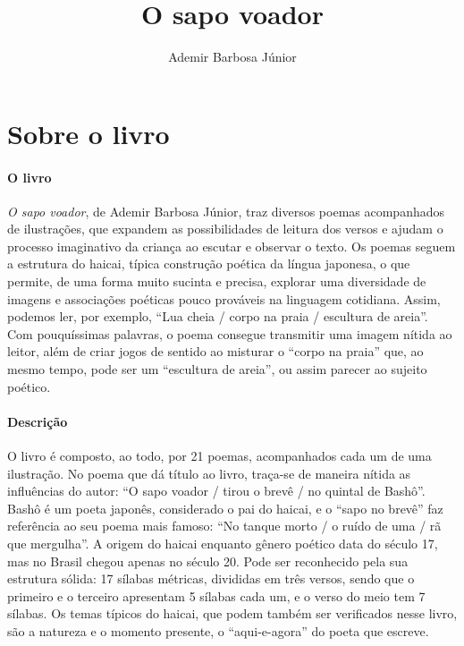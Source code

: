 \documentclass[11pt]{extarticle}
\newcommand{\AutorLivro}{Ademir Barbosa Júnior}
\newcommand{\TituloLivro}{O sapo voador}
\newcommand{\colaborador}{{Paulo Pompermaier e Renier Silva}}
\begin{document}
\title{\TituloLivro}
\author{\AutorLivro}
\def\authornotes{\colaborador}

\date{}
\maketitle


\tableofcontents



\section{Sobre o livro}

\paragraph{O livro} \textit{O sapo voador}, de Ademir Barbosa Júnior, traz diversos poemas acompanhados de ilustrações, que expandem as possibilidades de leitura dos versos e ajudam o processo imaginativo da criança ao escutar e observar o texto. Os poemas seguem a estrutura do haicai, típica construção poética da língua japonesa, o que permite, de uma forma muito sucinta e precisa, explorar uma diversidade de imagens e associações poéticas pouco prováveis na linguagem cotidiana. Assim, podemos ler, por exemplo, ``Lua cheia / corpo na praia / escultura de areia''. Com pouquíssimas palavras, o poema consegue transmitir uma imagem nítida ao leitor, além de criar jogos de sentido ao misturar o ``corpo na praia'' que, ao mesmo tempo, pode ser um ``escultura de areia'', ou assim parecer ao sujeito poético.


\paragraph{Descrição} O livro é composto, ao todo, por 21 poemas, acompanhados cada um de uma ilustração. No poema que dá título ao livro, traça-se de maneira nítida as influências do autor: ``O sapo voador / tirou o brevê / no quintal de Bashô''. Bashô é um poeta japonês, considerado o pai do haicai, e o ``sapo no brevê'' faz referência ao seu poema mais famoso: ``No tanque morto / o ruído de uma / rã que mergulha''. A origem do haicai enquanto gênero poético data do século 17, mas no Brasil chegou apenas no século 20. Pode ser reconhecido pela sua estrutura sólida: 17 sílabas métricas, divididas em três versos, sendo que o primeiro e o terceiro apresentam 5 sílabas cada um, e o verso do meio tem 7 sílabas.
Os temas típicos do haicai, que podem também ser verificados nesse livro, são a natureza e o momento presente, o ``aqui-e-agora'' do poeta que escreve.
\end{document}
